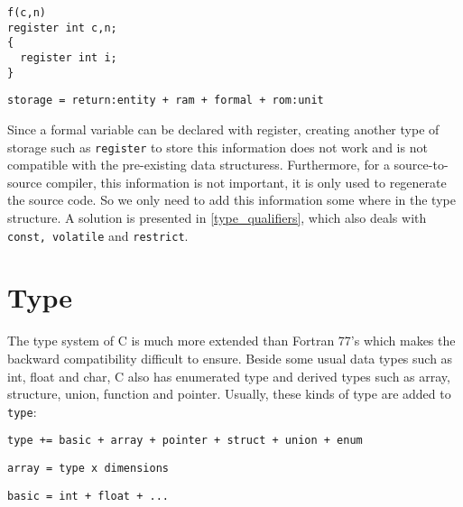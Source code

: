 \documentclass[a4paper]{report}
\begin{document}
\begin{lstlisting}
f(c,n)
register int c,n;
{
  register int i;
}
\end{lstlisting}

\begin{verbatim}
storage = return:entity + ram + formal + rom:unit
\end{verbatim}

Since a formal variable can be declared with register, creating
 another type of storage such as \verb/register/ to store this
 information does not work and is not compatible with the pre-existing
 data structuress. Furthermore, for a source-to-source compiler, this
 information is not important, it is only used to regenerate the
 source code. So we only need to add this information some where in
 the type structure. A solution is presented in \ref{type_qualifiers},
 which also deals with \verb/const, volatile/ and \verb/restrict/.


\chapter{Type}
\label{chapter:type}

The type system of C is much more extended than Fortran 77's which
 makes the backward compatibility difficult to ensure.  Beside some
 usual data types such as int, float and char, C also has enumerated
 type and derived types such as array, structure, union, function and
 pointer.  Usually, these kinds of type are added to \verb/type/:
 
\verb/type += basic + array + pointer + struct + union + enum/

\verb/array = type x dimensions/

\verb/basic = int + float + .../
\end{document}
